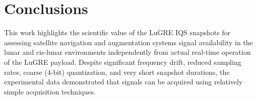 \documentclass{IEEEtaes}
\begin{document}




\section{Conclusions}
\label{sec:conclusion}
This work highlights the scientific value of the \gls{LuGRE} \gls{IQS} snapshots for assessing satellite navigation and augmentation systems signal availability in the lunar and cis-lunar environments independently from actual real-time operation of the \gls{LuGRE} payload. Despite significant frequency drift, reduced sampling rates, coarse (4-bit) quantization, and very short snapshot durations, the experimental data demonstrated that signals can be acquired using relatively simple acquisition techniques. 
\end{document}
